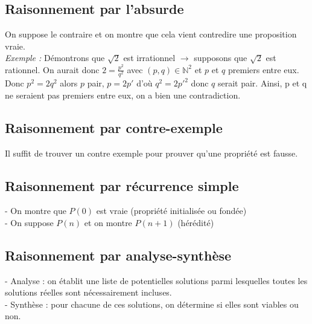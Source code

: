 \begin{multicols}{2}
    \subsection{Raisonnement par l'absurde}\label{subsec:raisonnement-par-l'absurde}
      
      On suppose le contraire et on montre que cela vient contredire une proposition vraie.\\
      \textit{Exemple :} Démontrons que $\sqrt{2}$ est irrationnel $\rightarrow$ supposons que $\sqrt{2}$ est rationnel.
      On aurait donc $2 = \frac{p^2}{q^2}$ avec $(p, q) \in \mathbb{N}^2$ et $p$ et $q$ premiers entre eux.
      Donc $p^2 = 2q^2$ alors $p$ pair, $p = 2p'$ d'où $q^2 = 2p'^2$ donc $q$ serait pair.
      Ainsi, p et q ne seraient pas premiers entre eux, on a bien une contradiction.
    
    \subsection{Raisonnement par contre-exemple}\label{subsec:raisonnement-par-contre-exemple}
      
      Il suffit de trouver un contre exemple pour prouver qu'une propriété est fausse.
    
    \subsection{Raisonnement par récurrence simple}\label{subsec:raisonnement-par-recurrence}
      
      - On montre que $P(0)$ est vraie (propriété initialisée ou fondée)\\
      - On suppose $P(n)$ et on montre $P(n+1)$ (hérédité)
    
    \subsection{Raisonnement par analyse-synthèse}\label{subsec:raisonnement-par-analyse-synthese}
      
      - Analyse : on établit une liste de potentielles solutions parmi lesquelles toutes les solutions réelles sont nécessairement incluses.\\
      - Synthèse : pour chacune de ces solutions,  on détermine si elles sont viables ou non.
  
  \end{multicols}
  
  
